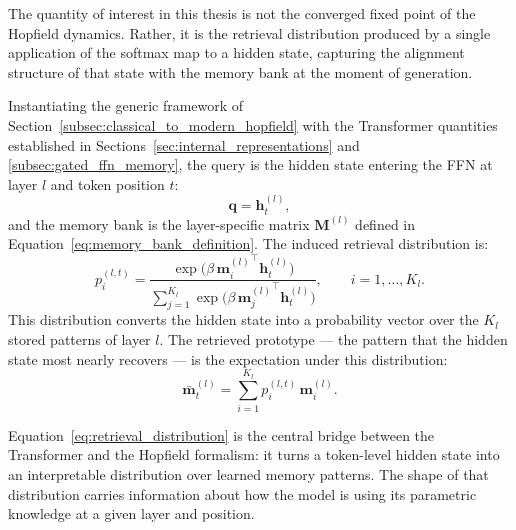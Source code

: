 The quantity of interest in this thesis is not the converged fixed point of the
Hopfield dynamics. Rather, it is the retrieval distribution produced by a single
application of the softmax map to a hidden state, capturing the alignment structure
of that state with the memory bank at the moment of generation.

Instantiating the generic framework of Section~\ref{subsec:classical_to_modern_hopfield}
with the Transformer quantities established in Sections~\ref{sec:internal_representations}
and \ref{subsec:gated_ffn_memory}, the query is the hidden state entering the FFN
at layer $l$ and token position $t$:
\begin{equation}
    \mathbf{q} = \mathbf{h}_t^{(l)},
    \label{eq:query_identification}
\end{equation}
and the memory bank is the layer-specific matrix $\mathbf{M}^{(l)}$ defined in
Equation~\eqref{eq:memory_bank_definition}. The induced retrieval distribution is:
\begin{equation}
    p_i^{(l,t)}
    =
    \frac{
        \exp\!\bigl(\beta\,{\mathbf{m}_i^{(l)}}^{\!\top}\mathbf{h}_t^{(l)}\bigr)
    }{
        \sum_{j=1}^{K_l}
        \exp\!\bigl(\beta\,{\mathbf{m}_j^{(l)}}^{\!\top}\mathbf{h}_t^{(l)}\bigr)
    },
    \qquad i = 1, \ldots, K_l.
    \label{eq:retrieval_distribution}
\end{equation}
This distribution converts the hidden state into a probability vector over the $K_l$
stored patterns of layer $l$. The retrieved prototype — the pattern that the hidden
state most nearly recovers — is the expectation under this distribution:
\begin{equation}
    \bar{\mathbf{m}}_t^{(l)}
    =
    \sum_{i=1}^{K_l} p_i^{(l,t)}\,\mathbf{m}_i^{(l)}.
    \label{eq:retrieved_pattern}
\end{equation}

Equation~\eqref{eq:retrieval_distribution} is the central bridge between the
Transformer and the Hopfield formalism: it turns a token-level hidden state into an
interpretable distribution over learned memory patterns. The shape of that
distribution carries information about how the model is using its parametric
knowledge at a given layer and position.


